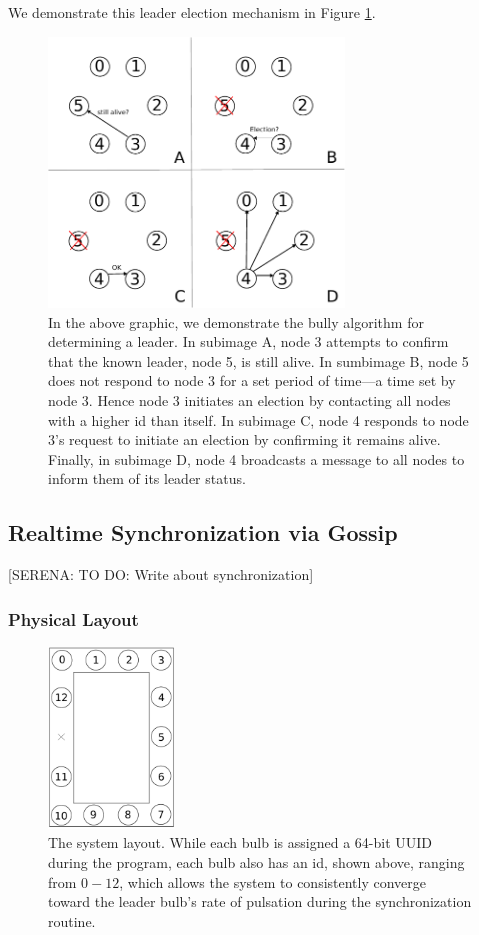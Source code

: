 \documentclass[preprint,review,12pt]{cs262}
\newcommand{\note}[3]{{\color{#2}[#1: #3]}}
\newcommand{\SERENA}[1]{\note{SERENA}{red}{#1}}
\begin{document}
We demonstrate this leader election mechanism in Figure \ref{fig:bully}. 
\begin{figure}
  \centering
  \includegraphics[width=0.7\textwidth]{figures/bully}
  \caption{In the above graphic, we demonstrate the bully algorithm for determining a leader. In subimage A, node 3 attempts to confirm that the known leader, node 5, is still alive. In sumbimage B, node 5 does not respond to node 3 for a set period of time---a time set by node 3. Hence node 3 initiates an election by contacting all nodes with a higher id than itself. In subimage C, node 4 responds to node 3's request to initiate an election by confirming it remains alive. Finally, in subimage D, node 4 broadcasts a message to all nodes to inform them of its leader status. 
 \label{fig:bully}}
\end{figure}

\subsection{Realtime Synchronization via Gossip}
\SERENA{TO DO: Write about synchronization}
\subsubsection{Physical Layout}

\begin{figure}[h]
  \centering
  \includegraphics[width=0.3\textwidth]{figures/system_layout}
  \caption{The system layout. While each bulb is assigned a 64-bit UUID during the program, each bulb also has an id, shown above, ranging from $0-12$, which allows the system to consistently converge toward the leader bulb's rate of pulsation during the synchronization routine. 
 \label{fig:layout}}
\end{figure}
\end{document}
